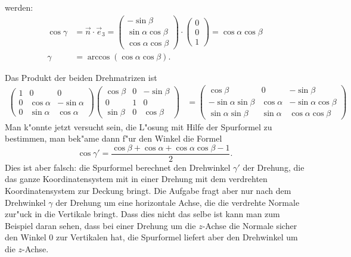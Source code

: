 \begin{loesung}
werden:
\begin{align*}
\cos\gamma
&=
\vec n\cdot\vec e_3=
\begin{pmatrix}
-\sin\beta\\
\sin\alpha\cos\beta\\
\cos\alpha\cos\beta
\end{pmatrix}
\cdot
\begin{pmatrix}0\\0\\1\end{pmatrix}=\cos\alpha\cos\beta
\\
\gamma&=\arccos(\cos\alpha\cos\beta).
\end{align*}
\end{loesung}

\begin{diskussion}
Das Produkt der beiden Drehmatrizen ist
\begin{align*}
\begin{pmatrix}
1&0&0\\
0&\cos\alpha&-\sin\alpha\\
0&\sin\alpha& \cos\alpha
\end{pmatrix}
\begin{pmatrix}
\cos\beta&0&-\sin\beta\\
0&1&0\\
\sin\beta&0&\cos\beta
\end{pmatrix}
&=
\begin{pmatrix}
\cos\beta           &0         &-\sin\beta\\
-\sin\alpha\sin\beta&\cos\alpha&-\sin\alpha\cos\beta\\
 \sin\alpha\sin\beta&\sin\alpha&\cos\alpha\cos\beta
\end{pmatrix}
\end{align*}
Man k"onnte jetzt versucht sein, die L"osung mit Hilfe der Spurformel
zu bestimmen, man bek"ame dann f"ur den Winkel die Formel
\[
\cos\gamma' = \frac{\cos\beta+\cos\alpha+\cos\alpha\cos\beta-1}{2}.
\]
Dies ist aber falsch: die Spurformel berechnet den Drehwinkel $\gamma'$
der Drehung,
die das ganze Koordinatensystem mit in einer Drehung mit dem verdrehten
Koordinatensystem zur Deckung bringt. Die Aufgabe fragt aber nur
nach dem Drehwinkel $\gamma$ der Drehung um eine horizontale Achse,
die die verdrehte Normale
zur"uck in die Vertikale bringt. Dass dies nicht das selbe ist kann
man zum Beispiel daran sehen, dass bei einer Drehung um die $z$-Achse 
die Normale sicher den Winkel 0 zur Vertikalen hat, die Spurformel
liefert aber den Drehwinkel um die $z$-Achse.
\end{diskussion}

